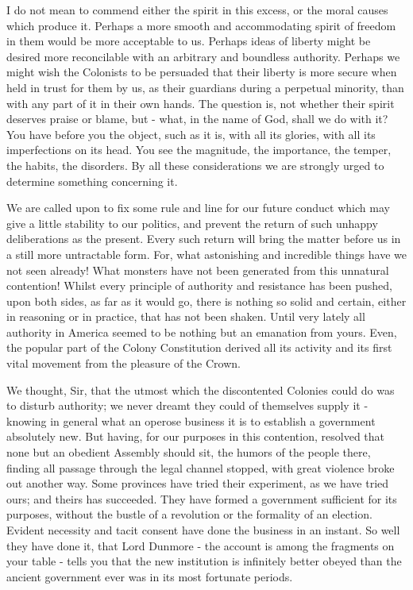 I do not mean to commend either the spirit in this excess, or the moral causes which produce it. Perhaps a more smooth and accommodating spirit of freedom in them would be more acceptable to us. Perhaps ideas of liberty might be desired more reconcilable with an arbitrary and boundless authority. Perhaps we might wish the Colonists to be persuaded that their liberty is more secure when held in trust for them by us, as their guardians during a perpetual minority, than with any part of it in their own hands. The question is, not whether their spirit deserves praise or blame, but - what, in the name of God, shall we do with it? You have before you the object, such as it is, with all its glories, with all its imperfections on its head. You see the magnitude, the importance, the temper, the habits, the disorders. By all these considerations we are strongly urged to determine something concerning it.\par

We are called upon to fix some rule and line for our future conduct which may give a little stability to our politics, and prevent the return of such unhappy deliberations as the present. Every such return will bring the matter before us in a still more untractable form. For, what astonishing and incredible things have we not seen already! What monsters have not been generated from this unnatural contention! Whilst every principle of authority and resistance has been pushed, upon both sides, as far as it would go, there is nothing so solid and certain, either in reasoning or in practice, that has not been shaken. Until very lately all authority in America seemed to be nothing but an emanation from yours. Even, the popular part of the Colony Constitution derived all its activity and its first vital movement from the pleasure of the Crown.\par

We thought, Sir, that the utmost which the discontented Colonies could do was to disturb authority; we never dreamt they could of themselves supply it - knowing in general what an operose business it is to establish a government absolutely new. But having, for our purposes in this contention, resolved that none but an obedient Assembly should sit, the humors of the people there, finding all passage through the legal channel stopped, with great violence broke out another way. Some provinces have tried their experiment, as we have tried ours; and theirs has succeeded. They have formed a government sufficient for its purposes, without the bustle of a revolution or the formality of an election. Evident necessity and tacit consent have done the business in an instant. So well they have done it, that Lord Dunmore - the account is among the fragments on your table - tells you that the new institution is infinitely better obeyed than the ancient government ever was in its most fortunate periods.\par

